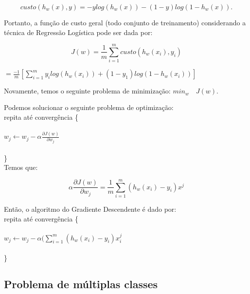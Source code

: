 \begin{equation}
\label{e.newnew_cost_function}
custo(h_w(x), y) = -y log(h_w(x)) - (1 - y) log(1 - h_w(x)).	
\end{equation}

Portanto, a função de custo geral (todo conjunto de treinamento) considerando a técnica de Regressão Logística pode ser dada por:

\begin{equation}
\label{e.general_cost_function}
J(w) = \frac{1}{m} \sum\limits_{i=1}^m custo(h_w(x_i), y_i)
\end{equation}
\begin{center}
$= \frac{-1}{m} [\sum\limits_{i=1}^m y_i log(h_w(x_i)) + (1 - y_1) log(1 - h_w(x_i))]$		
\end{center}


Novamente, temos o seguinte problema de minimização: $min_{w} \quad J(w)$.

Podemos solucionar o seguinte problema de optimização:\\

 repita até convergência \{ \\ \\
 \hspace*{25pt} $w_j \leftarrow w_j - \alpha \frac{\partial J(w)}{\partial w_j}$ \\ \\
 \hspace*{15pt} \}\\
 
Temos que:
 
\begin{equation}
\alpha \frac{\partial J(w)}{\partial w_j} = \frac{1}{m} \sum\limits_{i=1}^m (h_w(x_i) - y_i)x^j
\end{equation}

Então, o algoritmo do Gradiente Descendente é dado por:\\
 
repita até convergência \{ \\ \\
 \hspace*{25pt} $w_j \leftarrow w_j - \alpha(\sum\limits_{i=1}^m(h_w(x_i) - y_i)x_i^j$ \\ \\
 \hspace*{15pt} \}
 
\subsection{Problema de múltiplas classes}
\label{ss.multiclass_problem}

